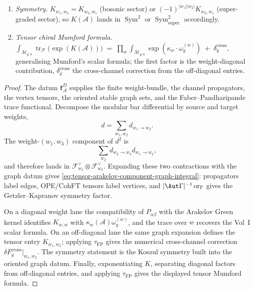 \begin{theorem}
\begin{enumerate}
 $2$-form. Its Faber--Pandharipande numerical trace contributes
 $\delta F_g^{\mathrm{cross}}|_{w_1,w_2}$ on the
 \textsc{all-weight} multi-sector stratum and vanishes on
 \textsc{uniform-weight}.
\item\label{td-iii} \emph{Symmetry.}
 $K_{w_1, w_2} = K_{w_2, w_1}$ (bosonic sector) or
 $(-1)^{|w_1||w_2|} K_{w_2, w_1}$ (super-graded sector), so
 $K(\mathcal{A})$ lands in $\operatorname{Sym}^2$ or
 $\operatorname{Sym}^2_{\mathrm{super}}$ accordingly.
\item\label{td-iv} \emph{Tensor chiral Mumford formula.}
$
 \int_{\overline{\mathcal{M}}_{g,n}} \operatorname{tr}_\mathcal{F}
 \bigl(\exp(K(\mathcal{A}))\bigr)
 \;=\;
 \prod_w
 \int_{\overline{\mathcal{M}}_{g,n}} \exp(\kappa_w \cdot
 \omega_g^{(w)})
 \;+\; \delta^{\mathrm{cross}}_g,
$
\noindent
generalising Mumford's scalar formula; the first factor is the
weight-diagonal contribution, $\delta^{\mathrm{cross}}_g$ the
cross-channel correction from the off-diagonal entries.
\end{enumerate}
\end{theorem}

\begin{proof}
The datum \(\mathfrak k_{\mathcal A}^{D}\) supplies the finite
weight-bundle, the channel propagators, the vertex tensors, the
oriented stable graph sets, and the Faber--Pandharipande trace
functional.  Decompose the modular bar differential by source and
target weights,
\[
d=\sum_{w_1,w_2}d_{w_1\to w_2}.
\]
The weight-\((w_1,w_3)\) component of \(d^2\) is
\[
\sum_{w_2} d_{w_2\to w_3}d_{w_1\to w_2},
\]
and therefore lands in
\(\mathcal F_{w_1}^{\vee}\otimes \mathcal F_{w_3}^{\vee}\).  Expanding
these two contractions with the graph datum gives
\eqref{eq:tensor-arakelov-component-graph-integral}: propagators label
edges, OPE/CohFT tensors label vertices, and
\(|\Aut\Gamma|^{-1}\operatorname{or}_{\Gamma}\) gives the
Getzler--Kapranov symmetry factor.

On a diagonal weight lane the compatibility of \(P_{\alpha\beta}\) with
the Arakelov Green kernel identifies \(K_{w,w}\) with
\(\kappa_w(\mathcal A)\omega_g^{(w)}\), and the trace over \(w\)
recovers the Vol~I scalar formula.  On an off-diagonal lane the same
graph expansion defines the tensor entry \(K_{w_1,w_2}\); applying
\(\tau_{\mathrm{FP}}\) gives the numerical cross-channel correction
\(\delta F_g^{\mathrm{cross}}|_{w_1,w_2}\).  The symmetry statement is
the Koszul symmetry built into the oriented graph datum.  Finally,
exponentiating \(K\), separating diagonal factors from off-diagonal
entries, and applying \(\tau_{\mathrm{FP}}\) gives the displayed tensor
Mumford formula.
\end{proof}

